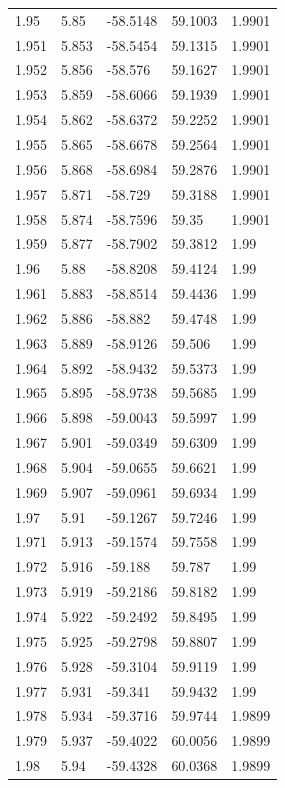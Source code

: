\begin{tabular}{lllll}
1.95 & 5.85 & -58.5148 & 59.1003 & 1.9901 \\
1.951 & 5.853 & -58.5454 & 59.1315 & 1.9901 \\
1.952 & 5.856 & -58.576 & 59.1627 & 1.9901 \\
1.953 & 5.859 & -58.6066 & 59.1939 & 1.9901 \\
1.954 & 5.862 & -58.6372 & 59.2252 & 1.9901 \\
1.955 & 5.865 & -58.6678 & 59.2564 & 1.9901 \\
1.956 & 5.868 & -58.6984 & 59.2876 & 1.9901 \\
1.957 & 5.871 & -58.729 & 59.3188 & 1.9901 \\
1.958 & 5.874 & -58.7596 & 59.35 & 1.9901 \\
1.959 & 5.877 & -58.7902 & 59.3812 & 1.99 \\
1.96 & 5.88 & -58.8208 & 59.4124 & 1.99 \\
1.961 & 5.883 & -58.8514 & 59.4436 & 1.99 \\
1.962 & 5.886 & -58.882 & 59.4748 & 1.99 \\
1.963 & 5.889 & -58.9126 & 59.506 & 1.99 \\
1.964 & 5.892 & -58.9432 & 59.5373 & 1.99 \\
1.965 & 5.895 & -58.9738 & 59.5685 & 1.99 \\
1.966 & 5.898 & -59.0043 & 59.5997 & 1.99 \\
1.967 & 5.901 & -59.0349 & 59.6309 & 1.99 \\
1.968 & 5.904 & -59.0655 & 59.6621 & 1.99 \\
1.969 & 5.907 & -59.0961 & 59.6934 & 1.99 \\
1.97 & 5.91 & -59.1267 & 59.7246 & 1.99 \\
1.971 & 5.913 & -59.1574 & 59.7558 & 1.99 \\
1.972 & 5.916 & -59.188 & 59.787 & 1.99 \\
1.973 & 5.919 & -59.2186 & 59.8182 & 1.99 \\
1.974 & 5.922 & -59.2492 & 59.8495 & 1.99 \\
1.975 & 5.925 & -59.2798 & 59.8807 & 1.99 \\
1.976 & 5.928 & -59.3104 & 59.9119 & 1.99 \\
1.977 & 5.931 & -59.341 & 59.9432 & 1.99 \\
1.978 & 5.934 & -59.3716 & 59.9744 & 1.9899 \\
1.979 & 5.937 & -59.4022 & 60.0056 & 1.9899 \\
1.98 & 5.94 & -59.4328 & 60.0368 & 1.9899 \\

\end{tabular}

